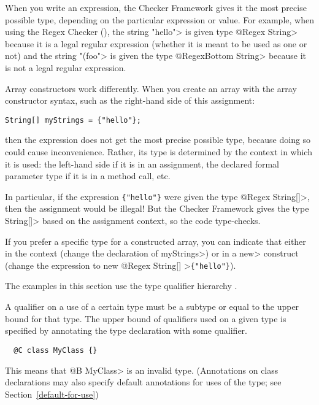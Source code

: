 
When you write an expression, the Checker Framework gives it the most
precise possible type, depending on the particular expression or value.
For example, when using the Regex Checker (),
the string \<"hello"> is given type \<@Regex String> because it is a legal
regular expression (whether it is meant to be used as one or not) and the
string \<"(foo"> is given the type \<@RegexBottom String> because it is not
a legal regular expression.

Array constructors work differently.  When you create an array with the
array constructor syntax, such as the right-hand side of this assignment:

\begin{Verbatim}
String[] myStrings = {"hello"};
\end{Verbatim}

\noindent
then the expression does not get the most precise possible type, because
doing so could cause inconvenience.  Rather, its type is determined by the
context in which it is used:  the left-hand side if it is in an assignment,
the declared formal parameter type if it is in a method call, etc.

In particular, if the expression \verb|{"hello"}| were given the type
\<@Regex String[]>, then the assignment would be illegal!  But the Checker
Framework gives the type \<String[]> based on the assignment context, so the code
type-checks.

If you prefer a specific type for a constructed array, you can indicate
that either in the context (change the declaration of \<myStrings>) or in a
\<new> construct (change the expression to \<new @Regex String[] >\verb|{"hello"}|).


The examples in this section use the type qualifier hierarchy .

A qualifier on a use of a certain type must be a subtype or equal to the upper bound for that type.
The upper bound of qualifiers used on a given type is specified by annotating the type declaration
with some qualifier.
\begin{Verbatim}
  @C class MyClass {}
\end{Verbatim}

This means that \<@B MyClass> is an invalid type.  (Annotations on class declarations may also specify
default annotations for uses of the type; see Section~\ref{default-for-use})

